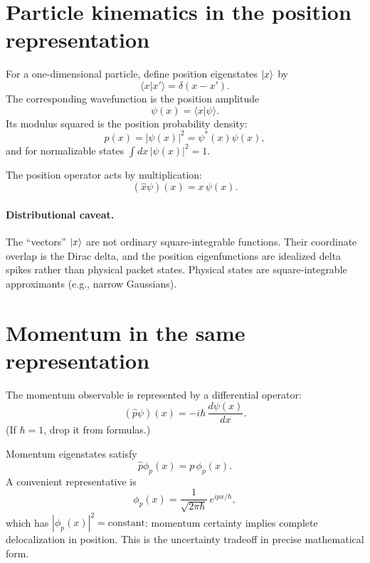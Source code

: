 \section{Particle kinematics in the position representation}

For a one-dimensional particle, define position eigenstates \(\left\lvert x\right\rangle\) by
\begin{equation}
\langle x|x'\rangle=\delta(x-x').
\end{equation}
The corresponding wavefunction is the position amplitude
\begin{equation}
\psi(x)=\langle x|\psi\rangle.
\end{equation}
Its modulus squared is the position probability density:
\begin{equation}
p(x)=|\psi(x)|^2 = \psi^*(x)\psi(x),
\end{equation}
and for normalizable states \(\int dx\,|\psi(x)|^2=1\).

The position operator acts by multiplication:
\begin{equation}
(\hat x\psi)(x)=x\,\psi(x).
\end{equation}

\paragraph{Distributional caveat.}
The “vectors'' \(\left\lvert x\right\rangle\) are not ordinary square-integrable functions. Their coordinate overlap is the Dirac delta, and the position eigenfunctions are idealized delta spikes rather than physical packet states. Physical states are square-integrable approximants (e.g., narrow Gaussians).

\section{Momentum in the same representation}

The momentum observable is represented by a differential operator:
\begin{equation}
(\hat p\psi)(x)=-i\hbar\,\frac{d\psi(x)}{dx}.
\end{equation}
(If \(\hbar=1\), drop it from formulas.)

Momentum eigenstates satisfy
\begin{equation}
\hat p\phi_p(x)=p\,\phi_p(x).
\end{equation}
A convenient representative is
\begin{equation}
\phi_p(x)=\frac{1}{\sqrt{2\pi\hbar}}\,e^{ipx/\hbar},
\end{equation}
which has \(|\phi_p(x)|^2=\text{constant}\): momentum certainty implies complete delocalization in position. This is the uncertainty tradeoff in precise mathematical form.

